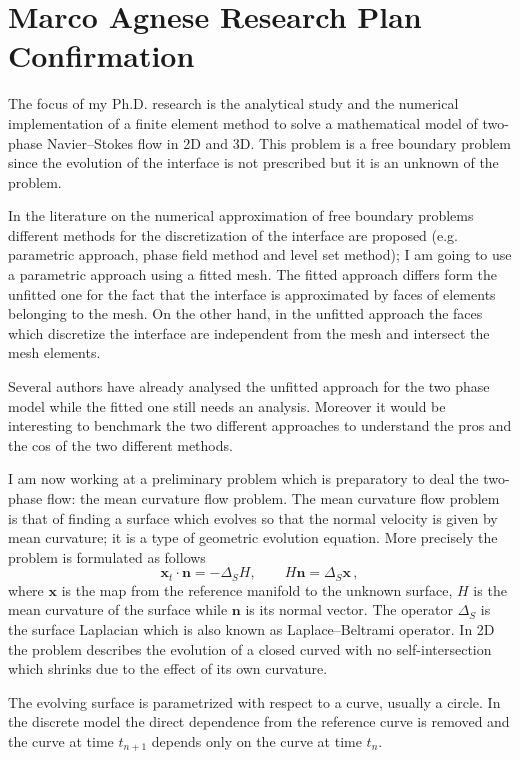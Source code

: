 \documentclass[a4paper,12pt]{report}
\newcommand{\gr}[1]{\textbf{#1}}
\begin{document}
\section*{Marco Agnese Research Plan Confirmation}
The focus of my Ph.D. research is the analytical study and the numerical
implementation of a finite element method to solve a mathematical model of
two-phase Navier--Stokes flow in 2D and 3D. This problem is a free boundary
problem since the evolution of the interface is not prescribed but it is an
unknown of the problem.

In the literature on the numerical approximation of free boundary problems
different methods for the discretization of the interface are proposed (e.g.
parametric approach, phase field method and level set method); I am going to use
a parametric approach using a fitted mesh. The fitted approach differs form the
unfitted one for the fact that the interface is approximated by faces of
elements belonging to the mesh. On the other hand, in the unfitted approach the
faces which discretize the interface are independent from the mesh and intersect
the mesh elements.

Several authors have already analysed the unfitted approach for the two phase
model while the fitted one still needs an analysis. Moreover it would be
interesting to benchmark the two different approaches to understand the pros and
the cos of the two different methods.
\newline

I am now working at a preliminary problem which is preparatory to deal the
two-phase flow: the mean curvature flow problem. The mean curvature flow problem
is that of finding a surface which evolves so that the normal velocity is given
by mean curvature; it is a type of geometric evolution equation. More precisely
the problem is formulated as follows
\begin{equation}
 \gr{x}_t\cdot\gr{n}=-\Delta_SH,\qquad H\gr{n}=\Delta_S\gr{x} \,,
\end{equation}
where $\gr{x}$ is the map from the reference manifold to the unknown surface,
$H$ is the mean curvature of the surface while $\gr{n}$ is its normal vector.
The operator $\Delta_S$ is the surface Laplacian which is also known as
Laplace--Beltrami operator. In 2D the problem describes the evolution of a
closed curved with no self-intersection which shrinks due to the effect of its
own curvature.

The evolving surface is parametrized with respect to a curve, usually a circle.
In the discrete model the direct dependence from the reference curve is removed
and the curve at time $t_{n+1}$ depends only on the curve at time $t_n$.
\newline
\end{document}
